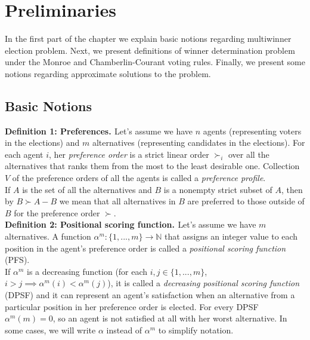 \chapter{Preliminaries}
\label{cha:preliminaries}

In the first part of the chapter we explain basic notions regarding multiwinner election problem. Next, we present definitions of winner determination problem under the Monroe and Chamberlin-Courant voting rules. Finally, we present some notions regarding approximate solutions to the problem.

\section{Basic Notions}
\noindent
\textbf{Definition 1: Preferences. \cite{1}} \hspace{.1in} Let's assume we have $n$ agents (representing voters in the elections) and $m$ alternatives (representing candidates in the elections). For each agent $i$, her \textit{preference order} is a strict linear order $\succ_{i}$ over all the alternatives that ranks them from the most to the least desirable one. Collection $V$ of the preference orders of all the agents is called a \textit{preference profile}.
\\

If $A$ is the set of all the alternatives and $B$ is a nonempty strict subset of $A$, then by $B \succ A - B$ we mean that all alternatives in $B$ are preferred to those outside of $B$ for the preference order $\succ$.
\\

\noindent
\textbf{Definition 2: Positional scoring function. \cite{1}} \hspace{.1in} Let's assume we have $m$ alternatives. A function $\alpha^{m}: \{1,...,m\} \rightarrow \mathbb{N}$ that assigns an integer value to each position in the agent's preference order is called a \textit{positional scoring function} (PFS). 
\\

If $\alpha^{m}$ is a decreasing function (for each $i, j \in \{1,...,m\}$, $i > j \implies \alpha^{m}(i) < \alpha^{m}(j)$), it is called a \textit{decreasing positional scoring function} (DPSF) and it can represent an agent's satisfaction when an alternative from a particular position in her preference order is elected. For every DPSF $\alpha^{m}(m) = 0$, so an agent is not satisfied at all with her worst alternative. In some cases, we will write $\alpha$ instead of $\alpha^{m}$ to simplify notation.
\\

